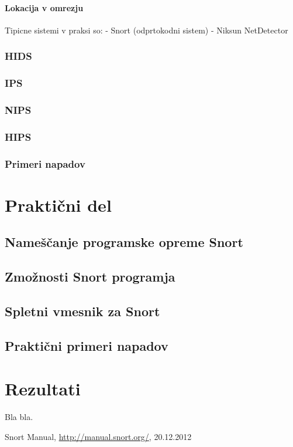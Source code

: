 \documentclass[12pt]{article}
\let\stdsection\section
\renewcommand\section{\newpage\stdsection}
\begin{document}
\paragraph{Lokacija v omrezju} %
\label{par:Lokacija v omrezju}




Tipicne sistemi v praksi so:
- Snort (odprtokodni sistem)
- Niksun NetDetector

\subsubsection{HIDS}



\subsubsection{IPS}
\subsubsection{NIPS}
\subsubsection{HIPS}
\subsubsection{Primeri napadov}


\section{Praktični del}

\subsection{Nameščanje programske opreme Snort}
\subsection{Zmožnosti Snort programja}
\subsection{Spletni vmesnik za Snort}
\subsection{Praktični primeri napadov}

\section{Rezultati}

Bla bla.

\clearpage
{}
\begin{thebibliography}{9}


Snort Manual, \url{http://manual.snort.org/}, 20.12.2012

\end{thebibliography}
\end{document}
